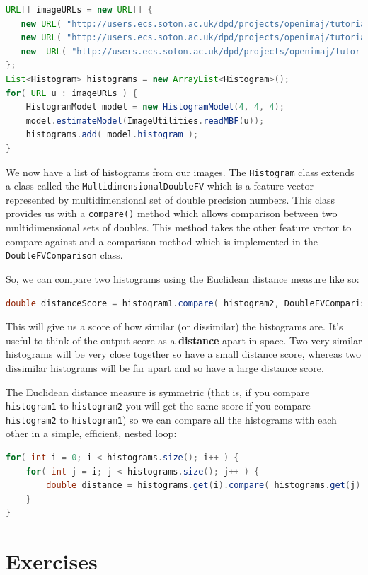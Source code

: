 \begin{lstlisting}[language=java]
URL[] imageURLs = new URL[] {
   new URL( "http://users.ecs.soton.ac.uk/dpd/projects/openimaj/tutorial/hist1.jpg" ),
   new URL( "http://users.ecs.soton.ac.uk/dpd/projects/openimaj/tutorial/hist2.jpg" ), 
   new  URL( "http://users.ecs.soton.ac.uk/dpd/projects/openimaj/tutorial/hist3.jpg" ) 
};
List<Histogram> histograms = new ArrayList<Histogram>();
for( URL u : imageURLs ) {
    HistogramModel model = new HistogramModel(4, 4, 4);
    model.estimateModel(ImageUtilities.readMBF(u));
    histograms.add( model.histogram );
}
\end{lstlisting}
We now have a list of histograms from our images.  The \verb+Histogram+ class extends a 
class called the \verb+MultidimensionalDoubleFV+ which is a feature vector represented 
by multidimensional set of double precision numbers.  This class provides us with a 
\verb+compare()+ method which allows comparison between two multidimensional sets of 
doubles. This method takes the other feature vector to compare against and a comparison 
method which is implemented in the \verb+DoubleFVComparison+ class.

So, we can compare two histograms using the Euclidean distance measure like so:
\begin{lstlisting}[language=java]
double distanceScore = histogram1.compare( histogram2, DoubleFVComparison.EUCLIDEAN );
\end{lstlisting}
This will give us a score of how similar (or dissimilar) the histograms are. It's useful
to think of the output score as a \textbf{distance} apart in space. Two very similar histograms 
will be very close together so have a small distance score, whereas two dissimilar 
histograms will be far apart and so have a large distance score.

The Euclidean distance measure is symmetric (that is, if you compare \verb+histogram1+ to 
\verb+histogram2+ you will get the same score if you compare \verb+histogram2+ to 
\verb+histogram1+) so we can compare all the histograms with each other in a simple, 
efficient, nested loop:
\begin{lstlisting}[language=java]
for( int i = 0; i < histograms.size(); i++ ) {
    for( int j = i; j < histograms.size(); j++ ) {
        double distance = histograms.get(i).compare( histograms.get(j), DoubleFVComparison.EUCLIDEAN );
    }
}
\end{lstlisting}

\section*{Exercises}
